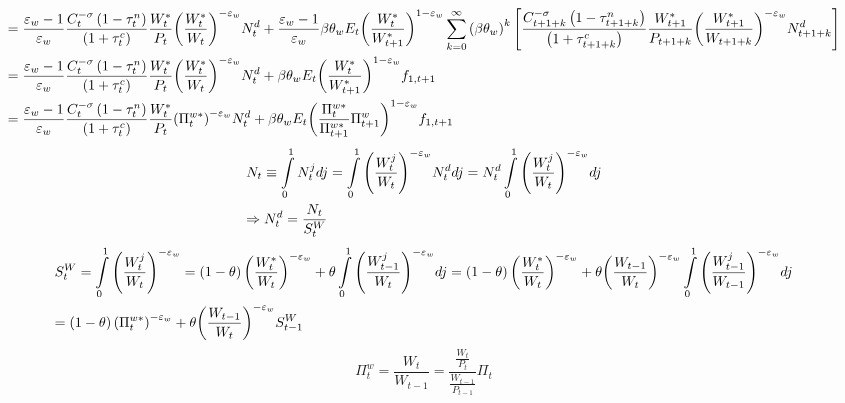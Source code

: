 \documentclass[12pt,a4paper]{article}
\begin{document}
\[\begin{gathered}
   = \frac{{{\varepsilon _w} - 1}}{{{\varepsilon _w}}}\frac{{C_t^{ - \sigma }\left( {1 - \tau _t^n} \right)}}{{\left( {1 + \tau _t^c} \right)}}\frac{{W_t^*}}{{{P_t}}}{\left( {\frac{{W_t^*}}{{{W_t}}}} \right)^{ - {\varepsilon _w}}}N_t^d + \frac{{{\varepsilon _w} - 1}}{{{\varepsilon _w}}}\beta {\theta _w}{E_t}{\left( {\frac{{W_t^*}}{{W_{t + 1}^*}}} \right)^{1 - {\varepsilon _w}}}\sum\limits_{k = 0}^\infty  {{{\left( {\beta {\theta _w}} \right)}^k}} \left[ {\frac{{C_{t + 1 + k}^{ - \sigma }\left( {1 - \tau _{t + 1 + k}^n} \right)}}{{\left( {1 + \tau _{t + 1 + k}^c} \right)}}\frac{{W_{t + 1}^*}}{{{P_{t + 1 + k}}}}{{\left( {\frac{{W_{t + 1}^*}}{{{W_{t + 1 + k}}}}} \right)}^{ - {\varepsilon _w}}}N_{t + 1 + k}^d} \right] \hfill \\
   = \frac{{{\varepsilon _w} - 1}}{{{\varepsilon _w}}}\frac{{C_t^{ - \sigma }\left( {1 - \tau _t^n} \right)}}{{\left( {1 + \tau _t^c} \right)}}\frac{{W_t^*}}{{{P_t}}}{\left( {\frac{{W_t^*}}{{{W_t}}}} \right)^{ - {\varepsilon _w}}}N_t^d + \beta {\theta _w}{E_t}{\left( {\frac{{W_t^*}}{{W_{t + 1}^*}}} \right)^{1 - {\varepsilon _w}}}{f_{1,t + 1}} \hfill \\
   = \frac{{{\varepsilon _w} - 1}}{{{\varepsilon _w}}}\frac{{C_t^{ - \sigma }\left( {1 - \tau _t^n} \right)}}{{\left( {1 + \tau _t^c} \right)}}\frac{{W_t^*}}{{{P_t}}}{\left( {\Pi _t^{w*}} \right)^{ - {\varepsilon _w}}}N_t^d + \beta {\theta _w}{E_t}{\left( {\frac{{\Pi _t^{w*}}}{{\Pi _{t + 1}^{w*}}}\Pi _{t + 1}^w} \right)^{1 - {\varepsilon _w}}}{f_{1,t + 1}}\hfill \\
\end{gathered} \]
\[\begin{gathered}
  {N_t} \equiv \int\limits_0^1 {N_t^j} dj = \int\limits_0^1 {{{\left( {\frac{{W_t^j}}{{{W_t}}}} \right)}^{ - {\varepsilon _w}}}N_t^d} dj = N_t^d\int\limits_0^1 {{{\left( {\frac{{W_t^j}}{{{W_t}}}} \right)}^{ - {\varepsilon _w}}}} dj \hfill \\
   \Rightarrow N_t^d = \frac{{{N_t}}}{{S_t^W}} \hfill \\
\end{gathered} \]
\[\begin{gathered}
  S_t^W = \int\limits_0^1 {{{\left( {\frac{{W_t^j}}{{{W_t}}}} \right)}^{ - {\varepsilon _w}}}}  = \left( {1 - \theta } \right){\left( {\frac{{W_t^*}}{{{W_t}}}} \right)^{ - {\varepsilon _w}}} + \theta \int\limits_0^1 {{{\left( {\frac{{W_{t - 1}^j}}{{{W_t}}}} \right)}^{ - {\varepsilon _w}}}dj}  = \left( {1 - \theta } \right){\left( {\frac{{W_t^*}}{{{W_t}}}} \right)^{ - {\varepsilon _w}}} + \theta {\left( {\frac{{{W_{t - 1}}}}{{{W_t}}}} \right)^{ - {\varepsilon _w}}}\int\limits_0^1 {{{\left( {\frac{{W_{t - 1}^j}}{{{W_{t - 1}}}}} \right)}^{ - {\varepsilon _w}}}dj}  \hfill \\
   = \left( {1 - \theta } \right){\left( {\Pi _t^{w*}} \right)^{ - {\varepsilon _w}}} + \theta {\left( {\frac{{{W_{t - 1}}}}{{{W_t}}}} \right)^{ - {\varepsilon _w}}}S_{t - 1}^W \hfill \\
\end{gathered} \]
\[\Pi _t^w = \frac{{{W_t}}}{{{W_{t - 1}}}} = \frac{{\frac{{{W_t}}}{{{P_t}}}}}{{\frac{{{W_{t - 1}}}}{{{P_{t - 1}}}}}}{\Pi _t}\]
\end{document}
